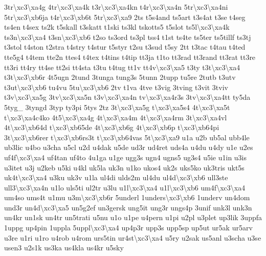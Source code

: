 {3tr\textbackslash{}xc3\textbackslash{}xa4g 4tr\textbackslash{}xc3\textbackslash{}xa4k t3r\textbackslash{}xc3\textbackslash{}xa4kn t4r\textbackslash{}xc3\textbackslash{}xa4n 5tr\textbackslash{}xc3\textbackslash{}xa4ni 5tr\textbackslash{}xc3\textbackslash{}xb6ja t4r\textbackslash{}xc3\textbackslash{}xb6t 5tr\textbackslash{}xc3\textbackslash{}xa9 2ts t5s4and ts5art t3s4at t3se t4seg ts4en t4sex ts2k t5skall t3skatt t1ski ts3kl tskotts5 t5slot ts5l\textbackslash{}xc3\textbackslash{}xa4k ts3n\textbackslash{}xc3\textbackslash{}xa4 t3sn\textbackslash{}xc3\textbackslash{}xb6 t2so ts3ord ts3pl tss4 t1st ts4te ts5ter ts5tillf ts3tj t3stol t4ston t2stra t4stry t4stur t5styr t2su t3sud t5sy 2tt t3tac t4tau t4ted tte5g4 t4tem tte2n ttes4 t4tex t4tins t4tip tt3ja t1to tt3rad tt3rand tt3rat tt3re tt3ri tt4ry tt4se tt2si tt4sta t3tu t4tug tt1v tt4v\textbackslash{}xc3\textbackslash{}xa5 t3ty t3t\textbackslash{}xc3\textbackslash{}xa4 t3t\textbackslash{}xc3\textbackslash{}xb6r 4t5ugn 2tund 3tunga tung3s 5tunn 2tupp tu5re 2tutb t3utv t3ut\textbackslash{}xc3\textbackslash{}xb6 tu4vu 5tu\textbackslash{}xc3\textbackslash{}xb6 2tv t1va 4tve t3vig 3tving t3vit 3tviv t3v\textbackslash{}xc3\textbackslash{}xa5g 3tv\textbackslash{}xc3\textbackslash{}xa5n t3v\textbackslash{}xc3\textbackslash{}xa4n tv\textbackslash{}xc3\textbackslash{}xa4r3s 3tv\textbackslash{}xc3\textbackslash{}xa4tt ty5da 5tyg\-\_\- 3tyngd 3typ ty3pi 5tys 2tz 3t\textbackslash{}xc3\textbackslash{}xa5g t\textbackslash{}xc3\textbackslash{}xa5s4 4t\textbackslash{}xc3\textbackslash{}xa5t t\textbackslash{}xc3\textbackslash{}xa4c4ko 4t5\textbackslash{}xc3\textbackslash{}xa4g 4t\textbackslash{}xc3\textbackslash{}xa4m 4t\textbackslash{}xc3\textbackslash{}xa4rm 3t\textbackslash{}xc3\textbackslash{}xa4vl 4t\textbackslash{}xc3\textbackslash{}xb64d t\textbackslash{}xc3\textbackslash{}xb65de 4t\textbackslash{}xc3\textbackslash{}xb6g 4t\textbackslash{}xc3\textbackslash{}xb6p t\textbackslash{}xc3\textbackslash{}xb64pi 3t\textbackslash{}xc3\textbackslash{}xb6rer t\textbackslash{}xc3\textbackslash{}xb6rs3t t\textbackslash{}xc3\textbackslash{}xb64vas 5t\textbackslash{}xc3\textbackslash{}xa9 u1a u2b ub5al ubb4le ub3lic u4bo u3cha u5cl u2d u4dak u5de ud3r ud4ret uds4a u4du u4dy u1e u2es uf4f\textbackslash{}xc3\textbackslash{}xa4 uf4tan uf4to 4u1ga u1ge ugg3s ugn4 ugns5 ug3s4 u5ie u1in u3is u3itet u3j u2keb u5ki u4kl uk5la uk3n u1ko ukos4 uk2s uks5ko uk3tris ukt5s uk4t\textbackslash{}xc3\textbackslash{}xa4 u3ku uk3v u1la ul4di ulds2m ul4du ul4d\textbackslash{}xc3\textbackslash{}xb6 ull3ste ull3\textbackslash{}xc3\textbackslash{}xa4n u1lo uls5ti ul2tr u3lu u1l\textbackslash{}xc3\textbackslash{}xa4 u1l\textbackslash{}xc3\textbackslash{}xb6 um4f\textbackslash{}xc3\textbackslash{}xa4 um4so ums4t u1mu u3m\textbackslash{}xc3\textbackslash{}xb6r 5underl 1unders\textbackslash{}xc3\textbackslash{}xb6 1underv un4dom und3r un4d\textbackslash{}xc3\textbackslash{}xa5 un5g2ef un3gersk ung5it ung3r ungs4p 3unif unk3l unk3n un4kr un1sk un4tr un5trati u5nu u1o u1pe u4pern u1pi u2pl u3plet up3lik 3uppfa 1uppg up4pin 1uppla 5uppl\textbackslash{}xc3\textbackslash{}xa4 up4p3r upp3s upp5sp up5ut ur5ak ur5arv u3re u1ri u1ro u4rob u4rom urs5tin ur4st\textbackslash{}xc3\textbackslash{}xa4 u5ry u2sak us5anl u3scha u3se usen3 u2s1k us3ka us4kla us4kr u5sky }
